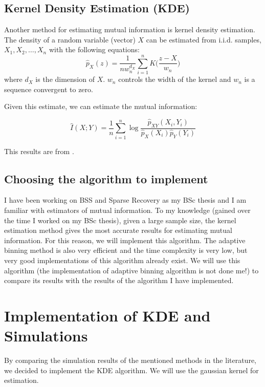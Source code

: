 \documentclass{article}
\begin{document}
	\subsection{Kernel Density Estimation (KDE)}
	
	Another method for estimating mutual information is kernel density estimation. The density of a random variable (vector) $X$ can be estimated from i.i.d. samples, $X_1, X_2, \dots, X_n$ with the following equations:
	$$\hat{p}_X(z) = \frac{1}{n w_n^{d_X}} \sum_{i = 1}^{n} K\Big(\frac{z - X}{w_n}\Big)$$
	where $d_X$ is the dimension of $X$. $w_n$ controls the width  of the kernel and $w_n$ is a sequence convergent to zero. 
	
	Given this estimate, we can estimate the mutual information:
	
	$$\hat{I}(X;Y) = \frac{1}{n} \sum_{i = 1}^{n} \log \frac{\hat{p}_{XY}(X_i, Y_i)}{\hat{p}_X(X_i)\hat{p}_Y(Y_i)}$$
	
	This results are from \cite{wang2009universal}.
	
	\subsection{Choosing the algorithm to implement}
	I have been working on BSS and Sparse Recovery as my BSc thesis and I am familiar with estimators of mutual information. To my knowledge (gained over the time I worked on my BSc thesis), given a large sample size, the kernel estimation method gives the most accurate results for estimating mutual information. For this reason, we will implement this algorithm. The adaptive binning method is also very efficient and the time complexity is very low, but very good implementations of this algorithm already exist. We will use this algorithm (the implementation of adaptive binning algorithm is not done me!) to compare its results with the results of the algorithm I have implemented.

	
	\section{Implementation of KDE and Simulations}
	By comparing the simulation results of the mentioned methods in the literature, we decided to implement the KDE algorithm. We will use the gaussian kernel for estimation.
	
\end{document}
